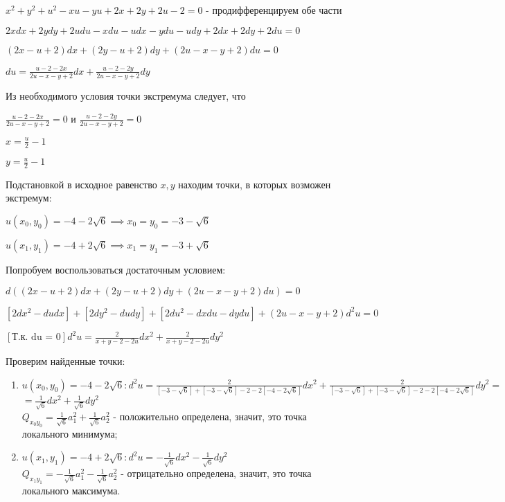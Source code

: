 \documentclass{article}
\begin{document}
\noindent $x^2+y^2+u^2-xu-yu+2x+2y+2u-2=0$ - продифференцируем обе части\vspace{1mm}

\noindent $2xdx + 2ydy + 2udu - xdu - udx - ydu - udy + 2dx + 2dy + 2du = 0$\vspace{1mm}

\noindent $(2x-u+2)dx + (2y-u+2)dy + (2u - x - y + 2)du = 0$\vspace{1mm}

\noindent$du = \frac{u-2-2x}{2u-x-y+2}dx + \frac{u-2-2y}{2u-x-y+2}dy$\vspace{1mm}

\noindent Из необходимого условия точки экстремума следует, что\vspace{1mm}

\noindent $\frac{u-2-2x}{2u-x-y+2}=0$ и $\frac{u-2-2y}{2u-x-y+2} = 0$\vspace{1mm}

\noindent$x = \frac{u}{2} - 1$\vspace{1mm}

\noindent$y = \frac{u}{2} - 1$\vspace{1mm}

\noindent Подстановкой в исходное равенство $x,y$ находим точки, в которых возможен экстремум: \vspace{1mm}

\noindent $u(x_0,y_0)=-4-2\sqrt{6} \implies x_0 = y_0 = -3-\sqrt{6}$\vspace{1mm}

\noindent$u(x_1,y_1)=-4+2\sqrt{6} \implies x_1=y_1 = -3 + \sqrt{6}$\vspace{1mm}

\noindent Попробуем воспользоваться достаточным условием:\vspace{1mm}

\noindent $d((2x-u+2)dx + (2y-u+2)dy + (2u - x - y + 2)du) = 0$\vspace{1mm}

\noindent $[2dx^2 - dudx] + [2dy^2 - dudy] + [2du^2 - dxdu - dydu] + (2u-x-y+2)d^2u= 0$\vspace{1mm}

\noindent $[\text{Т.к. du = 0}]d^2u = \frac{2}{x+y-2-2u}dx^2 + \frac{2}{x+y-2-2u}dy^2$\vspace{10mm}

\noindent Проверим найденные точки:
\begin{enumerate}
\item $u(x_0,y_0) = -4-2\sqrt{6}: d^2u = \frac{2}{[-3-\sqrt{6}]+[-3-\sqrt{6}]-2-2[-4-2\sqrt{6}]}dx^2 +\frac{2}{[-3-\sqrt{6}]+[-3-\sqrt{6}]-2-2[-4-2\sqrt{6}]}dy^2=$\\
$=\frac{1}{\sqrt{6}}dx^2+\frac{1}{\sqrt{6}}dy^2$\\
$Q_{x_0y_0}=\frac{1}{\sqrt{6}}a_1^2+\frac{1}{\sqrt{6}}a_2^2$ - положительно определена, значит, это точка локального минимума;
\item $u(x_1,y_1) = -4 + 2\sqrt{6}: d^2u = -\frac{1}{\sqrt{6}}dx^2 -\frac{1}{\sqrt{6}}dy^2$\\
$Q_{x_1y_1}=-\frac{1}{\sqrt{6}}a_1^2-\frac{1}{\sqrt{6}}a_2^2$ - отрицательно определена, значит, это точка локального максимума.
\end{enumerate}
\end{document}
